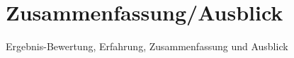 \chapter{Zusammenfassung/Ausblick}
\label{sec:schluss}
Ergebnis-Bewertung, Erfahrung, Zusammenfassung und Ausblick
